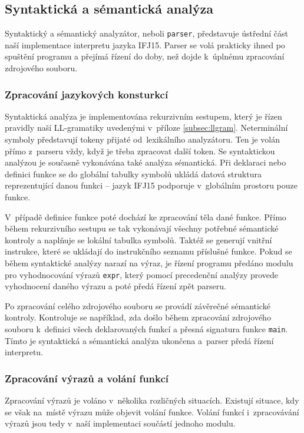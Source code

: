 \documentclass[a4paper, 12pt]{article}
\begin{document}
\subsection{Syntaktická a sémantická analýza} \label{parser}

Syntaktický a sémantický analyzátor, neboli \texttt{parser}, představuje ústřední
část naší implementace interpretu jazyka IFJ15. Parser se volá prakticky ihned po
spuštění programu a přejímá řízení do doby, než dojde k~úplnému zpracování
zdrojového souboru.

\subsubsection{Zpracování jazykových konsturkcí}
Syntaktická analýza je implementována rekurzivním sestupem, který je řízen
pravidly naší LL-gramatiky uvedenými v~příloze \ref{subsec:llgram}.
Neterminální symboly představují tokeny přijaté od~lexikálního analyzátoru.
Ten je volán přímo z~parseru vždy, když je třeba
zpracovat další token. Se syntaktickou analýzou je současně vykonávána také
analýza sémantická. Při deklaraci nebo definici funkce se do globální tabulky
symbolů ukládá datová struktura reprezentující danou funkci -- jazyk IFJ15
podporuje v~globálním prostoru pouze funkce.

V~případě definice funkce poté dochází ke zpracování těla dané funkce.
Přímo během rekurzivního sestupu se tak vykonávají všechny potřebné
sémantické kontroly a naplňuje se lokální tabulka symbolů. Taktéž se generují
vnitřní instrukce, které se ukládají do instrukčního seznamu příslušné funkce.
Pokud se během syntaktické analýzy narazí na výraz, je řízení programu předáno
modulu pro vyhodnocování výrazů \texttt{expr}, který pomocí precedenční analýzy
provede vyhodnocení daného výrazu a poté předá řízení zpět parseru.

Po zpracování celého zdrojového souboru se provádí závěrečné sémantické
kontroly. Kontroluje se například, zda došlo během zpracování zdrojového
souboru k~definici všech deklarovaných funkcí a přesná signatura funkce
\texttt{main}. Tímto je syntaktická a sémantická analýza ukončena a~parser předá
řízení interpretu.

\newpage

\subsubsection{Zpracování výrazů a volání funkcí}
Zpracování výrazů je voláno v~několika rozličných situacích. Existují situace,
kdy se však na~místě výrazu může objevit volání funkce. Volání funkcí i~zpracovávání
výrazů jsou tedy v~naší implementaci součástí jednoho modulu.
\end{document}
